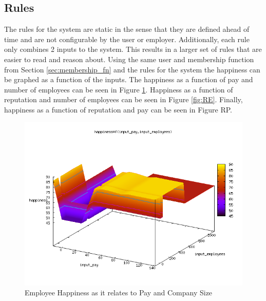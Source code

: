 \documentclass[12pt,fleqn,reqno,letterpaper]{article}
\begin{document}
\subsection{Rules}
The rules for the system are static in the sense that they are defined ahead of time and are not configurable by the user or employer. Additionally, each rule only combines 2 inputs to the system. This results in a larger set of rules that are easier to read and reason about. Using the same user and membership function from Section \ref{sec:membership_fn} and the rules for the system the happiness can be graphed as a function of the inputs. The happiness as a function of pay and number of employees can be seen in Figure \ref{fig:PE}. Happiness as a function of reputation and number of employees can be seen in Figure \ref{fig:RE}. Finally, happiness as a function of reputation and pay can be seen in Figure RP.

\begin{figure}[H]
  \centering
  \includegraphics[scale=0.5,natwidth=640,natheight=480]{fig/baseline_input_pay_input_employees_happiness.png}
  \caption{Employee Happiness as it relates to Pay and Company Size}
  \label{fig:PE}
\end{figure}
\end{document}
